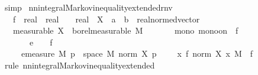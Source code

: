 \begin{isabellebody}
\ simp\isanewline
{}\isamarkupfalse%
%
\endisatagproof
{\isafoldproof}%
%
\isadelimproof
%
\endisadelimproof
\isanewline
\isanewline
{}\isamarkupfalse%
\ nn{\isacharunderscore}{\kern0pt}integral{\isacharunderscore}{\kern0pt}Markov{\isacharunderscore}{\kern0pt}inequality{\isacharunderscore}{\kern0pt}extended{\isacharunderscore}{\kern0pt}rnv{\isacharcolon}{\kern0pt}\isanewline
\ \ \ f\ {\isacharcolon}{\kern0pt}{\isacharcolon}{\kern0pt}\ {\isachardoublequoteopen}real\ {\isasymRightarrow}\ real{\isachardoublequoteclose}\ \ {\isasymepsilon}\ {\isacharcolon}{\kern0pt}{\isacharcolon}{\kern0pt}\ real\ \ X\ {\isacharcolon}{\kern0pt}{\isacharcolon}{\kern0pt}\ {\isachardoublequoteopen}{\isacharprime}{\kern0pt}a\ {\isasymRightarrow}\ {\isacharprime}{\kern0pt}b\ {\isacharcolon}{\kern0pt}{\isacharcolon}{\kern0pt}\ real{\isacharunderscore}{\kern0pt}normed{\isacharunderscore}{\kern0pt}vector{\isachardoublequoteclose}\isanewline
\ \ \ {\isacharbrackleft}{\kern0pt}measurable{\isacharbrackright}{\kern0pt}{\isacharcolon}{\kern0pt}\ {\isachardoublequoteopen}X\ {\isasymin}\ borel{\isacharunderscore}{\kern0pt}measurable\ M{\isachardoublequoteclose}\isanewline
\ \ \ \ \ \ \ mono{\isacharcolon}{\kern0pt}\ {\isachardoublequoteopen}mono{\isacharunderscore}{\kern0pt}on\ {\isacharbraceleft}{\kern0pt}{}{\isachardot}{\kern0pt}{\isachardot}{\kern0pt}{\isacharbraceright}{\kern0pt}\ f{\isachardoublequoteclose}\isanewline
\ \ \ \ \ \ \ e{\isacharcolon}{\kern0pt}\ {\isachardoublequoteopen}{\isasymepsilon}\ {\isachargreater}{\kern0pt}\ {}{\isachardoublequoteclose}\ {\isachardoublequoteopen}f\ {\isasymepsilon}\ {\isachargreater}{\kern0pt}\ {}{\isachardoublequoteclose}\isanewline
\ \ \ \ \ {\isachardoublequoteopen}emeasure\ M\ {\isacharbraceleft}{\kern0pt}p\ {\isasymin}\ space\ M{\isachardot}{\kern0pt}\ norm\ {\isacharparenleft}{\kern0pt}X\ p{\isacharparenright}{\kern0pt}\ {\isasymge}\ {\isasymepsilon}{\isacharbraceright}{\kern0pt}\ {\isasymle}\ {\isacharparenleft}{\kern0pt}{\isasymintegral}\isactrlsup {\isacharplus}{\kern0pt}\ x{\isachardot}{\kern0pt}\ f\ {\isacharparenleft}{\kern0pt}norm\ {\isacharparenleft}{\kern0pt}X\ x{\isacharparenright}{\kern0pt}{\isacharparenright}{\kern0pt}\ {\isasympartial}M{\isacharparenright}{\kern0pt}\ {\isacharslash}{\kern0pt}\ f\ {\isasymepsilon}{\isachardoublequoteclose}\isanewline
%
\isadelimproof
\ \ %
\endisadelimproof
%
\isatagproof
{}\isamarkupfalse%
\ {\isacharparenleft}{\kern0pt}rule\ nn{\isacharunderscore}{\kern0pt}integral{\isacharunderscore}{\kern0pt}Markov{\isacharunderscore}{\kern0pt}inequality{\isacharunderscore}{\kern0pt}extended{\isacharparenright}{\kern0pt}\isanewline

\end{isabellebody}
